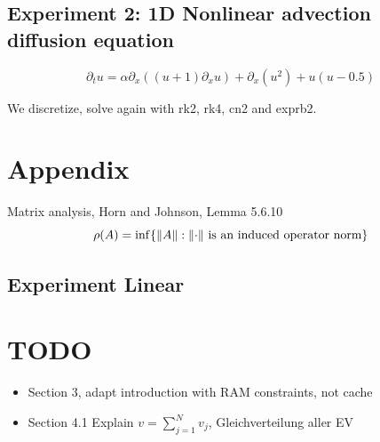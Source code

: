 \documentclass{scrartcl}
\begin{document}
	
	\subsection{Experiment 2: 1D Nonlinear advection diffusion equation}
	\[ \partial_tu = \alpha\partial_{x}((u+1)\partial_{x}u) + \partial_{x}(u^2) + u(u-0.5) \]
	
	We discretize, solve again with rk2, rk4, cn2 and exprb2.
	
	\section{Appendix}
	Matrix analysis, Horn and Johnson, Lemma 5.6.10
	\[\rho(A) = \inf\{\lVert A\rVert : \lVert\cdot\rVert \text{ is an induced operator norm} \} \]
	
	
	\subsection{Experiment Linear}
	\newcommand{\Pe}{Pe=10.0}
	\newcommand{\precision}{single}
	\newcommand{\safe}{sf=1.1}
	
	
	\section{TODO}

	\begin{itemize}
		\item Section 3, adapt introduction with RAM constraints, not cache
		\item Section 4.1 Explain $v=\sum_{j=1}^N v_j$, Gleichverteilung aller EV		
	\end{itemize}
	
\end{document}
